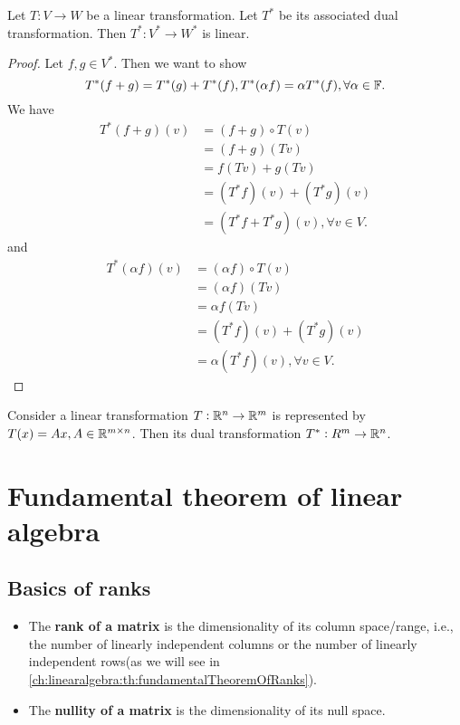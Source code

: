 \begin{refsection}
\begin{lemma}
Let $T:V\to W$ be a linear transformation. Let $T^*$ be its associated dual transformation. Then $T^*:V^*\to W^*$ is linear. 		
\end{lemma}
\begin{proof}
Let $f,g\in V^*$. Then we want to show $$T^*(f+g) = T^*(g) + T^*(f), T^*(\alpha f) = \alpha T^*(f),\forall \alpha\in \mathbb{F}.$$
We have
\begin{align*}
T^*(f+g)(v) &= (f+g)\circ T(v) \\
&= (f+g)(Tv) \\
&= f(Tv) + g(Tv) \\
&= (T^*f)(v) + (T^*g)(v) \\
&=(T^*f + T^*g)(v), \forall v\in V.
\end{align*}
and
\begin{align*}
T^*(\alpha f)(v) &= (\alpha f)\circ T(v) \\
&= (\alpha f)(Tv) \\
&= \alpha f(Tv) \\
&= (T^*f)(v) + (T^*g)(v) \\
&=\alpha(T^*f)(v), \forall v\in V.
\end{align*}
\end{proof}


\begin{definition}
Consider a linear transformation $T:\mathbb{R}^n\to \mathbb{R}^m$ is represented by $T(x) = Ax, A\in \mathbb{R}^{m\times n}$. Then its dual transformation $T^*: R^{m}\to \mathbb{R}^n$.	
\end{definition}


\section{Fundamental theorem of linear algebra}
\subsection{Basics of ranks}
\begin{definition}\cite[129]{banerjee2014linear}\hfill
	\begin{itemize}
		\item The \textbf{rank of a matrix} is the dimensionality of its column space/range, i.e., the number of linearly independent columns or the number of linearly independent rows(as we will see in \autoref{ch:linearalgebra:th:fundamentalTheoremOfRanks}).
		\item The \textbf{nullity of a matrix} is the dimensionality of its null space. 
	\end{itemize}	
\end{definition}


\end{refsection}
